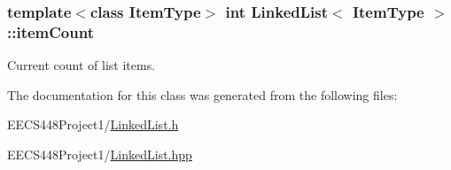 \subsubsection[{\texorpdfstring{item\+Count}{itemCount}}]{\setlength{\rightskip}{0pt plus 5cm}template$<$class Item\+Type$>$ int {\bf Linked\+List}$<$ Item\+Type $>$\+::item\+Count\hspace{0.3cm}{\ttfamily [private]}}\hypertarget{classLinkedList_a964b92cf1253774e9e35f331d5fb3490}{}\label{classLinkedList_a964b92cf1253774e9e35f331d5fb3490}


Current count of list items. 



The documentation for this class was generated from the following files\+:\begin{DoxyCompactItemize}
\item 
E\+E\+C\+S448\+Project1/\hyperlink{LinkedList_8h}{Linked\+List.\+h}\item 
E\+E\+C\+S448\+Project1/\hyperlink{LinkedList_8hpp}{Linked\+List.\+hpp}\end{DoxyCompactItemize}
